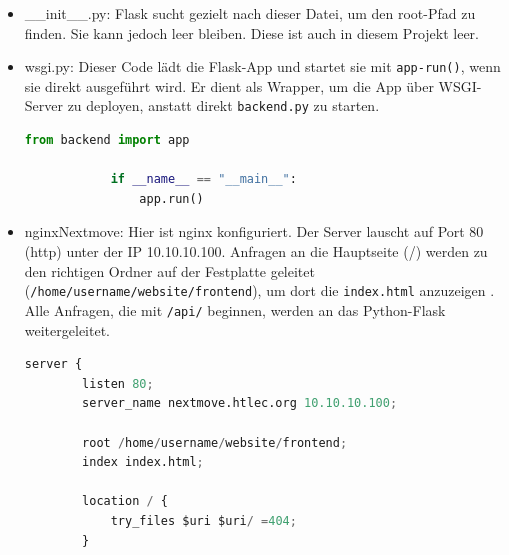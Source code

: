 \begin{itemize}
    \item \_\_init\_\_.py: Flask sucht gezielt nach dieser Datei, um den root-Pfad zu finden. 
    Sie kann jedoch leer bleiben. Diese ist auch in diesem Projekt leer.
    \item wsgi.py: Dieser Code lädt die Flask-App und startet sie mit \texttt{app-run()}, 
    wenn sie direkt ausgeführt wird. Er dient als Wrapper, um die App über WSGI-Server zu 
    deployen, anstatt direkt \texttt{backend.py} zu starten.
    \begin{scriptsize}
        \begin{lstlisting}[style=Python, language=Python, captionpos=b, stepnumber=5, caption = {wsgi.py}]
            from backend import app

            if __name__ == "__main__":
                app.run()
        \end{lstlisting}
    \end{scriptsize}
    \item nginxNextmove: Hier ist nginx konfiguriert. Der Server lauscht auf Port 80 (http) 
    unter der IP 10.10.10.100. Anfragen an die Hauptseite (/) werden zu den richtigen Ordner 
    auf der Festplatte geleitet (\texttt{/home/username/website/frontend}), um dort die 
    \texttt{index.html} anzuzeigen \cite{NginxGuide}. Alle Anfragen, die mit \texttt{/api/} 
    beginnen, werden an das Python-Flask weitergeleitet. 

    \begin{scriptsize}
        \begin{lstlisting}[style=Python, language=Python, captionpos=b, stepnumber=5, caption = {nginxNextmove}]
    server {
        listen 80;
        server_name nextmove.htlec.org 10.10.10.100;

        root /home/username/website/frontend;
        index index.html;

        location / {
            try_files $uri $uri/ =404;
        }


\end{lstlisting}
\end{scriptsize}
\end{itemize}

